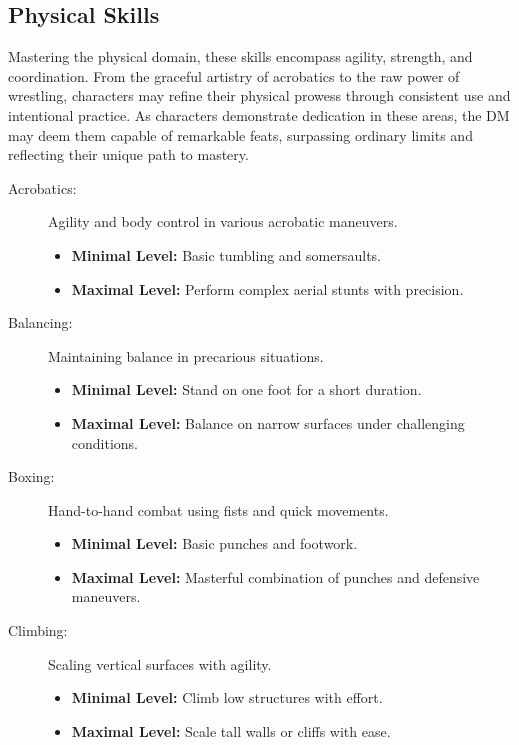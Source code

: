 \documentclass[12pt]{book}
\begin{document}
\subsection{\textbf{Physical Skills}}

Mastering the physical domain, these skills encompass agility, strength, and coordination. From the graceful artistry of acrobatics to the raw power of wrestling, characters may refine their physical prowess through consistent use and intentional practice. As characters demonstrate dedication in these areas, the DM may deem them capable of remarkable feats, surpassing ordinary limits and reflecting their unique path to mastery.

\begin{description}
    \item[Acrobatics:] Agility and body control in various acrobatic maneuvers.
        \begin{itemize}
            \item \textbf{Minimal Level:} Basic tumbling and somersaults.
            \item \textbf{Maximal Level:} Perform complex aerial stunts with precision.
        \end{itemize}
    
    \item[Balancing:] Maintaining balance in precarious situations.
        \begin{itemize}
            \item \textbf{Minimal Level:} Stand on one foot for a short duration.
            \item \textbf{Maximal Level:} Balance on narrow surfaces under challenging conditions.
        \end{itemize}

    \item[Boxing:] Hand-to-hand combat using fists and quick movements.
        \begin{itemize}
            \item \textbf{Minimal Level:} Basic punches and footwork.
            \item \textbf{Maximal Level:} Masterful combination of punches and defensive maneuvers.
        \end{itemize}

    \item[Climbing:] Scaling vertical surfaces with agility.
        \begin{itemize}
            \item \textbf{Minimal Level:} Climb low structures with effort.
            \item \textbf{Maximal Level:} Scale tall walls or cliffs with ease.
        \end{itemize}


\end{description}
\end{document}

